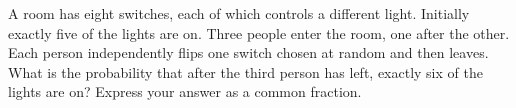 A room has eight switches, each of which controls a different light. Initially exactly five of the lights are on. Three people enter the room, one after the other. Each person independently flips one switch chosen at random and then leaves. What is the probability that after the third person has left, exactly six of the lights are on? Express your answer as a common fraction.
